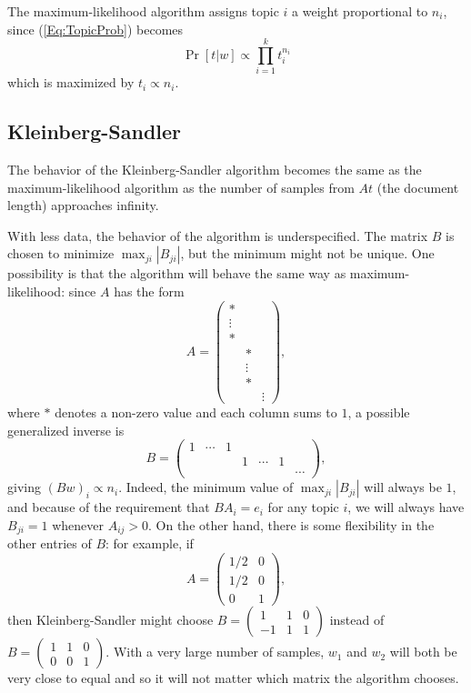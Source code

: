 \documentclass{article}
\begin{document}
The maximum-likelihood algorithm assigns topic \(i\) a weight proportional to \(n_i\), since (\ref{Eq:TopicProb}) becomes
\[ \Pr[t | w] \propto \prod_{i=1}^k t_i^{n_i} \]
which is maximized by \(t_i \propto n_i\).

\subsection{Kleinberg-Sandler}

The behavior of the Kleinberg-Sandler algorithm becomes the same as the maximum-likelihood algorithm as the number of samples from \(A t\) (the document length) approaches infinity.

With less data, the behavior of the algorithm is underspecified.
The matrix \(B\) is chosen to minimize \(\max_{ji} |B_{ji}|\), but the minimum might not be unique.
One possibility is that the algorithm will behave the same way as maximum-likelihood: since \(A\) has the form
\[
    A =
    \begin{pmatrix}
        *      &        &
    \\  \vdots &        &
    \\  *      &        &
    \\         & *      &
    \\         & \vdots &
    \\         & *      &
    \\         &        & \vdots
    \end{pmatrix}
    ,
\]
    where \(*\) denotes a non-zero value and each column sums to \(1\), a possible generalized inverse is
\[
    B =
    \begin{pmatrix}
        1 & \cdots & 1 &   &        &   &
    \\    &        &   & 1 & \cdots & 1 &
    \\    &        &   &   &        &   & \cdots
    \end{pmatrix}
    ,
\]
    giving \((B w)_i \propto n_i\).
Indeed, the minimum value of \(\max_{ji} |B_{ji}|\) will always be \(1\), and because of the requirement that \(B A_i = e_i\) for any topic \(i\), we will always have \(B_{ji} = 1\) whenever \(A_{ij} > 0\).
On the other hand, there is some flexibility in the other entries of \(B\): for example, if
\[
    A =
    \begin{pmatrix}
        1/2 & 0
    \\  1/2 & 0
    \\  0   & 1
    \end{pmatrix}
    ,
\]
    then Kleinberg-Sandler might choose
\(
    B =
    \begin{pmatrix}
         1 & 1 & 0
    \\  -1 & 1 & 1
    \end{pmatrix}
\)
instead of
\(
    B =
    \begin{pmatrix}
        1 & 1 & 0
    \\  0 & 0 & 1
    \end{pmatrix}
\).
With a very large number of samples, \(w_1\) and \(w_2\) will both be very close to equal and so it will not matter which matrix the algorithm chooses.
\end{document}
